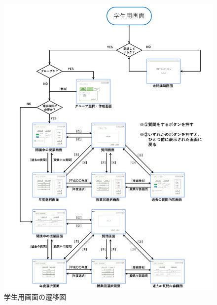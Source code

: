 \begin{figure}[htbp]
  \begin{center}
    \includegraphics[width=1\linewidth,clip]{./img/for_student.png}
    \caption{学生用画面の遷移図}\label{fig:for_student}
  \end{center}
\end{figure}


